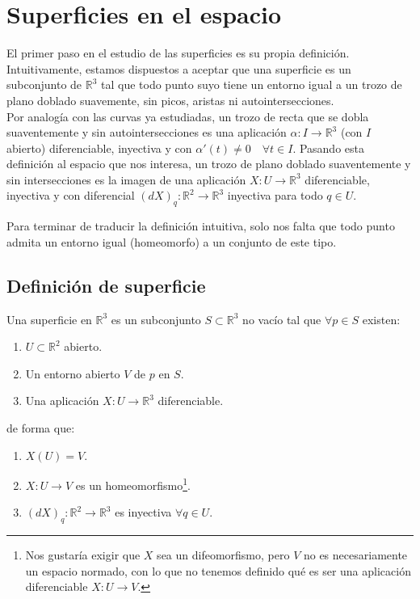 \chapter{Superficies en el espacio}
\noindent
El primer paso en el estudio de las superficies es su propia definición. Intuitivamente, estamos dispuestos a aceptar que una superficie es un subconjunto de $\mathbb{R}^3$ tal que todo punto suyo tiene un entorno igual a un trozo de plano doblado suavemente, sin picos, aristas ni autointersecciones.\\

\noindent
Por analogía con las curvas ya estudiadas, un trozo de recta que se dobla suaventemente y sin autointersecciones es una aplicación $\alpha:I\to\mathbb{R}^3$ (con $I$ abierto) diferenciable, inyectiva y con $\alpha'(t)\neq 0 \quad \forall t\in I$. Pasando esta definición al espacio que nos interesa, un trozo de plano doblado suaventemente y sin intersecciones es la imagen de una aplicación $X:U\to\mathbb{R}^3$ diferenciable, inyectiva y con diferencial $(dX)_q:\mathbb{R}^2\to\mathbb{R}^3$ inyectiva para todo $q\in U$.

Para terminar de traducir la definición intuitiva, solo nos falta que todo punto admita un entorno igual (homeomorfo) a un conjunto de este tipo.

\section{Definición de superficie}

\begin{definicion}
    Una superficie en $\mathbb{R}^3$ es un subconjunto $S\subset\mathbb{R}^3$ no vacío tal que $\forall p\in S$ existen:
    \begin{enumerate}[label=\alph*)]
        \item $U\subset\mathbb{R}^2$ abierto.
        \item Un entorno abierto $V$ de $p$ en $S$.
        \item Una aplicación $X:U\to \mathbb{R}^3$ diferenciable.
    \end{enumerate}
    de forma que:
    \begin{enumerate}
        \item $X(U) = V$.
        \item $X:U\to V$ es un homeomorfismo\footnote{Nos gustaría exigir que $X$ sea un difeomorfismo, pero $V$ no es necesariamente un espacio normado, con lo que no tenemos definido qué es ser una aplicación diferenciable $X:U\to V$.}.
        \item $(dX)_q:\mathbb{R}^2\to \mathbb{R}^3$ es inyectiva $\forall q\in U$.
    \end{enumerate}
\end{definicion}

